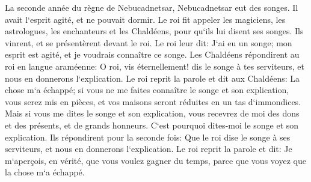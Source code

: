 \verse La seconde année du règne de Nebucadnetsar, Nebucadnetsar eut des songes. Il avait l`esprit agité, et ne pouvait dormir. 
\verse Le roi fit appeler les magiciens, les astrologues, les enchanteurs et les Chaldéens, pour qu`ils lui disent ses songes. Ils vinrent, et se présentèrent devant le roi. 
\verse Le roi leur dit: J`ai eu un songe; mon esprit est agité, et je voudrais connaître ce songe. 
\verse Les Chaldéens répondirent au roi en langue araméenne: O roi, vis éternellement! dis le songe à tes serviteurs, et nous en donnerons l`explication. 
\verse Le roi reprit la parole et dit aux Chaldéens: La chose m`a échappé; si vous ne me faites connaître le songe et son explication, vous serez mis en pièces, et vos maisons seront réduites en un tas d`immondices. 
\verse Mais si vous me dites le songe et son explication, vous recevrez de moi des dons et des présents, et de grands honneurs. C`est pourquoi dites-moi le songe et son explication. 
\verse Ils répondirent pour la seconde fois: Que le roi dise le songe à ses serviteurs, et nous en donnerons l`explication. 
\verse Le roi reprit la parole et dit: Je m`aperçois, en vérité, que vous voulez gagner du temps, parce que vous voyez que la chose m`a échappé. 

